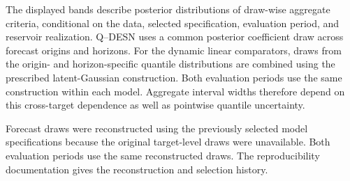 The displayed bands describe posterior distributions of draw-wise aggregate
criteria, conditional on the data, selected specification, evaluation
period, and reservoir realization. Q--DESN uses a common posterior coefficient
draw across forecast origins and horizons. For the dynamic linear comparators,
draws from the origin- and horizon-specific quantile distributions are combined
using the prescribed latent-Gaussian construction. Both evaluation periods use
the same construction within each model. Aggregate interval widths therefore
depend on this cross-target dependence as well as pointwise quantile uncertainty.

Forecast draws were reconstructed using the previously selected model
specifications because the original target-level draws were unavailable.
Both evaluation periods use the same reconstructed draws. The reproducibility
documentation gives the reconstruction and selection history.
